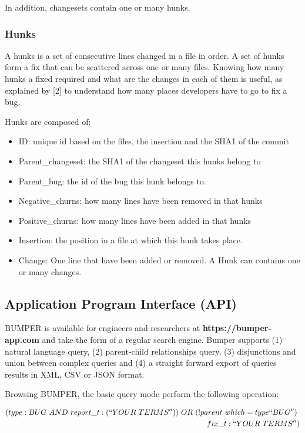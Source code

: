 In addition, changesets contain one or many hunks.

\subsubsection{Hunks}
A hunks is a set of consecutive lines changed in a file in order. A set of hunks form a fix that can be scattered across one or many files. Knowing how many hunks a fixed required and what are the changes in each of them is useful, as explained by [2] to understand how many places developers have to go to fix a bug.

Hunks are composed of:

\begin{itemize}
\item ID: unique id based on the files, the insertion and the SHA1 of the commit
\item Parent\_changeset: the SHA1 of the changeset this hunks belong to
\item Parent\_bug: the id of the bug this hunk belongs to.
\item Negative\_churns: how many lines have been removed in that hunks
\item Positive\_churns: how many lines have been added in that hunks
\item Insertion: the position in a file at which this hunk takes place.
\item Change: One line that have been added or removed. A Hunk can contains one or many changes.
\end{itemize}

\subsection{Application Program Interface (API)\label{sec:bumper-api}}

BUMPER is available for engineers and researchers at {\bf https://bumper-app.com} and take the form of a regular search engine. Bumper supports (1) natural language query, (2) parent-child relationships query, (3) disjunctions and union between complex queries and (4) a straight forward export of queries results in XML, CSV or JSON format.

Browsing BUMPER, the basic query mode perform the following operation:

\begin{equation}
\begin{split}
(type:BUG~AND~report\_t:(``YOUR~TERMS''))~OR~(!parent~which=type``BUG'')~\\fix\_t:``YOUR~TERMS'')
\end{split}
\end{equation}

